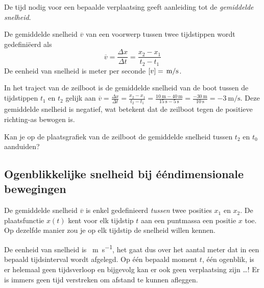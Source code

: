 \documentclass{ximera}
\begin{document}

De tijd nodig voor een bepaalde verplaatsing geeft aanleiding tot de \textit{gemiddelde snelheid}. 


\begin{definition}
	
De gemiddelde snelheid $\overline{v}$ van een voorwerp tussen twee tijdstippen wordt gedefiniëerd als
\[
\overline{v}=\frac{\Delta x}{\Delta t}=\frac{x_2-x_1}{t_2-t_1}
\]
De eenheid van snelheid is meter per seconde $[v]=\rm\,m/s$. 
\end{definition}


In het traject van de zeilboot is de gemiddelde snelheid van de boot tussen de tijdstippen $t_1$ en $t_2$ gelijk aan 
$\overline{v} =\frac{\Delta x}{\Delta t} =\frac{x_2-x_1}{t_2-t_1}=\frac{\SI{10}{\meter} - \SI{40}{\meter}}{\SI{15}{\second} - \SI{5}{\second}}= \frac{\SI{-30}{\meter}}{\SI{10}{\second}} = \SI{-3}{\meter\per\second}$. 
Deze gemiddelde snelheid is negatief, wat betekent dat de zeilboot tegen de positieve richting-as bewogen is. 


\begin{quickquestion*}{}{}
Kan je op de plaatsgrafiek van de zeilboot de gemiddelde snelheid tussen \(t_2\) en \(t_0\) aanduiden? 
\end{quickquestion*}



\subsection*{Ogenblikkelijke snelheid bij ééndimensionale bewegingen}

De gemiddelde snelheid \(\overline{v}\) is enkel gedefinieerd \textit{tussen} twee posities \(x_1\) en \(x_2\). 
De plaatsfunctie \(x(t)\) kent voor elk tijdstip \(t\) aan een puntmassa een positie \(x\) toe. Op dezelfde manier zou je op elk tijdstip de snelheid willen kennen. 

De eenheid van snelheid is \SI{}{\meter\per\second}, het gaat dus over het aantal meter dat in een bepaald tijds\-in\-ter\-val wordt afgelegd. 
Op één bepaald moment \(t\), één ogenblik, is er helemaal geen tijdsverloop en bijgevolg kan er ook geen verplaatsing zijn \ldots! Er is immers geen tijd verstreken om afstand te kunnen afleggen.
\end{document}

